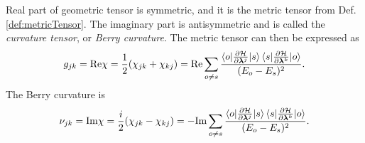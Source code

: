Real part of geometric tensor is symmetric, and it is the metric tensor from Def. \ref{def:metricTensor}. The imaginary part is antisymmetric and is called the \emph{curvature tensor}, or \emph{Berry curvature}. The metric tensor can then be expressed as
\begin{equation}
    g_{jk} =\text{Re} \chi = \frac{1}{2}(\chi_{jk}+\chi_{kj}) = \text{Re} \sum_{o\neq s}\frac{\braket{o|\frac{\partial \mathcal{H}}{\partial {\bm\lambda}^j}|s}\braket{s|\frac{\partial \mathcal{H}}{\partial {\bm\lambda}^k}|o}}{(E_o-E_s)^2}.
    \label{eq:metrictensorREdefinition}
\end{equation}
The Berry curvature is
\begin{equation}
        \nu_{jk} =\textrm{Im} \chi= \frac{i}{2}(\chi_{jk}-\chi_{kj})=  - \textrm{Im} \sum_{o\neq s}\frac{\braket{o|\frac{\partial \mathcal{H}}{\partial {\bm\lambda}^j}|s}\braket{s|\frac{\partial \mathcal{H}}{\partial {\bm\lambda}^k}|o}}{(E_o-E_s)^2}.
    \label{eq:geomtensorREdefinition}
\end{equation}




